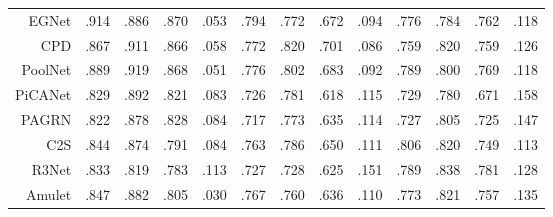 \begin{table}[!ht]
{\begin{tabular}{rcccccccccccc}
			
			EGNet   \upcite{zhao2019egnet}
			& .914 & .886 & .870 & .053 
			& .794 & .772 & .672 & .094 
			& .776 & .784 & .762 & .118 
			\\ 
			
			CPD  \upcite{wu2019cascaded}
			& .867 & .911 & .866 & .058 
			& .772 & .820 & .701 & .086 
			& .759 & .820 & .759 & .126 \\
			
			PoolNet \upcite{liu2019simple}
			& .889 & .919 & .868 & .051 
			& .776 & .802 & .683 & .092 
			& .789 & .800 & .769 & .118 \\
			
			PiCANet \upcite{liu2018picanet}
			& .829 & .892 & .821 & .083 
			& .726 & .781 & .618 & .115 
			& .729 & .780 & .671 & .158 \\
			
			PAGRN \upcite{wang2018detect}
			& .822 & .878 & .828 & .084 
			& .717 & .773 & .635 & .114 
			& .727 & .805 & .725 & .147 \\
			
			C2S   \upcite{li2018contour}
			& .844 & .874 & .791 & .084 
			& .763 & .786 & .650 & .111 
			& .806 & .820 & .749 & .113 \\
			
			R3Net  \upcite{deng2018r3net}
			& .833 & .819 & .783 & .113 
			& .727 & .728 & .625 & .151 
			& .789 & .838 & .781 & .128 \\
			
			Amulet \upcite{zhang2017amulet}
			& .847 & .882 & .805 & .030 
			& .767 & .760 & .636 & .110  
			& .773 & .821 & .757 & .135 \\
			
			
			\bottomrule[2pt] %
		\end{tabular}
	}
\end{table}
%
%




